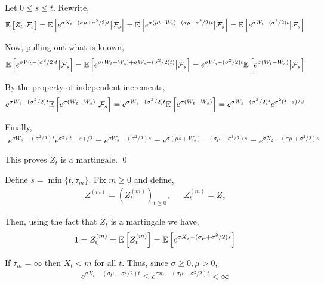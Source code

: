 \begin{solution}[Solution]
Let \( 0\leq s\leq t \). Rewrite,
\begin{align*}
    \mathbb{E} \left[ Z_t \big| \mathcal{F}_s \right]
    = \mathbb{E} \left[ e^{\sigma X_t - (\sigma \mu+\sigma^2/2)t } \big|\mathcal{F}_s \right]
    = \mathbb{E} \left[ e^{\sigma (\mu t+W_t) - (\sigma \mu+\sigma^2/2)t } \big|\mathcal{F}_s \right]
    = \mathbb{E} \left[ e^{\sigma W_t - (\sigma^2/2)t } \big|\mathcal{F}_s \right]
\end{align*}

Now, pulling out what is known,
\begin{align*}
    \mathbb{E} \left[ e^{\sigma W_t - (\sigma^2/2)t } \big|\mathcal{F}_s \right]
    = \mathbb{E} \left[ e^{\sigma (W_t-W_s) + \sigma W_s-(\sigma^2/2)t)} \big|\mathcal{F}_s \right]
    = e^{\sigma W_s - (\sigma^2/2)t} \mathbb{E} \left[ e^{\sigma (W_t-W_s)} \big|\mathcal{F}_s \right]
\end{align*}

By the property of independent increments,
\begin{align*}
    e^{\sigma W_s - (\sigma^2/2)t} \mathbb{E} \left[ e^{\sigma (W_t-W_s)} \big|\mathcal{F}_s \right]
    = e^{\sigma W_s - (\sigma^2/2)t} \mathbb{E} \left[ e^{\sigma (W_t-W_s)} \right]
    = e^{\sigma W_s - (\sigma^2/2)t} e^{\sigma^2(t-s)/2}
\end{align*}

Finally,
\begin{align*}
    e^{\sigma W_s - (\sigma^2/2)t} e^{\sigma^2(t-s)/2}
    =e^{\sigma W_s - (\sigma^2/2)s}
    =e^{\sigma (\mu s+W_s) - (\sigma\mu  +\sigma^2/2)s}
    =e^{\sigma X_2 - (\sigma\mu  +\sigma^2/2)s}
\end{align*}

This proves \( Z_t \) is a martingale. \qed


Define \( s=\min\{t,\tau_m\} \). Fix \( m\geq 0 \) and define,
\begin{align*}
    Z^{(m)} = \left( Z_t^{(m)} \right)_{t\geq 0}, && Z_t^{(m)} = Z_s
\end{align*}

Then, using the fact that \( Z_t \) is a martingale we have,
\begin{align*}
    1 = Z_0^{(m)} = \mathbb{E} \left[ Z_t^{(m)} \right]
    = \mathbb{E} \left[ e^{\sigma X_s - (\sigma \mu+\sigma^2/2) s} \right]
\end{align*}

If \( \tau_m = \infty \) then \( X_{t} < m \) for all \( t \). Thus, since \( \sigma\geq0, \mu>0 \), 
\begin{align*}
    e^{\sigma X_t - (\sigma\mu+\sigma^2/2)t} \leq  
    e^{\sigma m - (\sigma\mu+\sigma^2/2)t} < \infty
\end{align*}


\end{solution}
